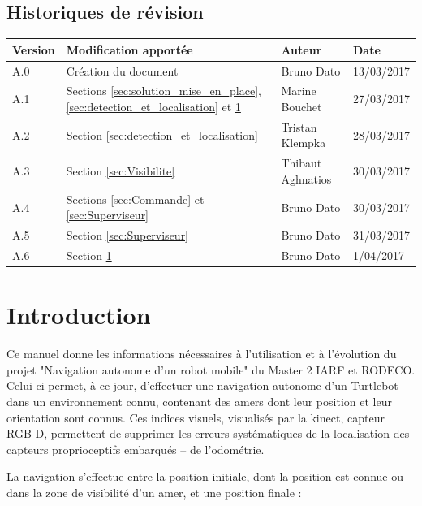 \documentclass[10pt,a4paper]{article}
\begin{document}
\subsection*{Historiques de révision}

\begin{center}
    \begin{tabular}{| l | l | l | l |}
    \hline
     \rowcolor{gray} Version & Modification apportée & Auteur & Date \\ \hline
    A.0 & Création du document & Bruno Dato & 13/03/2017\\ \hline
    A.1 & Sections \ref{sec:solution_mise_en_place}, \ref{sec:detection_et_localisation} et \ref{sec:introduction} & Marine Bouchet & 27/03/2017\\ \hline
    A.2 & Section \ref{sec:detection_et_localisation} & Tristan Klempka & 28/03/2017\\ \hline
    A.3 & Section \ref{sec:Visibilite} & Thibaut Aghnatios & 30/03/2017\\ \hline
    A.4 & Sections \ref{sec:Commande} et \ref{sec:Superviseur} & Bruno Dato & 30/03/2017\\ \hline
    A.5 & Section \ref{sec:Superviseur} & Bruno Dato & 31/03/2017\\ \hline
    A.6 & Section \ref{sec:introduction} & Bruno Dato & 1/04/2017\\ \hline
     
    \end{tabular}
\end{center}

\newpage
\tableofcontents
\newpage

\section{Introduction}
\label{sec:introduction}

Ce manuel donne les informations nécessaires à l'utilisation et à l'évolution du projet "Navigation autonome d'un robot mobile" du Master 2 IARF et RODECO. Celui-ci permet, à ce jour, d'effectuer une navigation autonome  d'un Turtlebot dans un environnement connu, contenant des amers dont leur position et leur orientation sont connus. Ces indices visuels, visualisés par la kinect, capteur RGB-D, permettent de supprimer les erreurs systématiques de la localisation des capteurs proprioceptifs embarqués -- de l'odométrie. 

La navigation s'effectue entre la position initiale, dont la position est connue ou dans la zone de visibilité d'un amer, et une position finale : 
\end{document}
